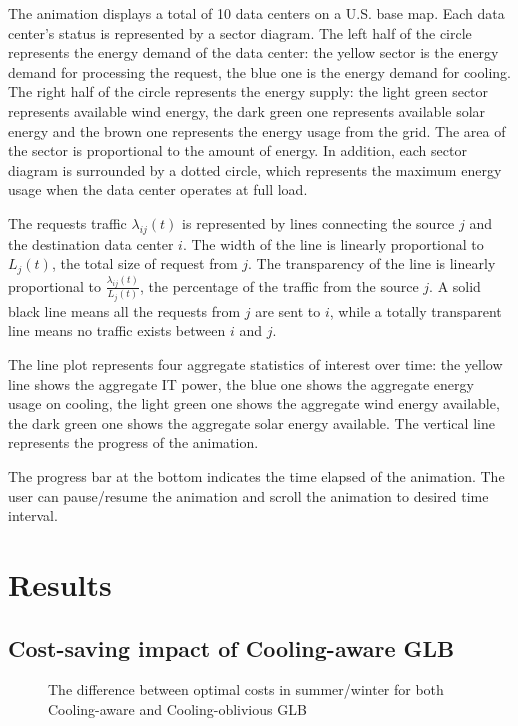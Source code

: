 \documentclass{acm_proc_article-sp}
\begin{document}
The animation displays a total of 10 data centers on a U.S. base map. Each data center's status is represented by a sector diagram. The left half of the circle represents the energy demand of the data center: the yellow sector is the energy demand for processing the request, the blue one is the energy demand for cooling. The right half of the circle represents the energy supply: the light green sector represents available wind energy, the dark green one represents available solar energy and the brown one represents the energy usage from the grid. The area of the sector is proportional to the amount of energy. In addition, each sector diagram is surrounded by a dotted circle, which represents the maximum energy usage when the data center operates at full load.

The requests traffic $\lambda_{ij}(t)$ is represented by lines connecting the source $j$ and the destination data center $i$. The width of the line is linearly proportional to $L_j(t)$, the total size of request from $j$. The transparency of the line is linearly proportional to $\frac{\lambda_{ij}(t)}{L_j(t)}$, the percentage of the traffic from the source $j$. A solid black line means all the requests from $j$ are sent to $i$, while a totally transparent line means no traffic exists between $i$ and $j$.

The line plot represents four aggregate statistics of interest over time: the yellow line shows the aggregate IT power, the blue one shows the aggregate energy usage on cooling, the light green one shows the aggregate wind energy available, the dark green one shows the aggregate solar energy available. The vertical line represents the progress of the animation.

The progress bar at the bottom indicates the time elapsed of the animation. The user can pause/resume the animation and scroll the animation to desired time interval.


\section{Results}
\subsection{Cost-saving impact of Cooling-aware GLB}

\begin{figure}
\centering
{}
\caption{The difference between optimal costs in summer/winter for both Cooling-aware and Cooling-oblivious GLB}
\end{figure}
\end{document}

